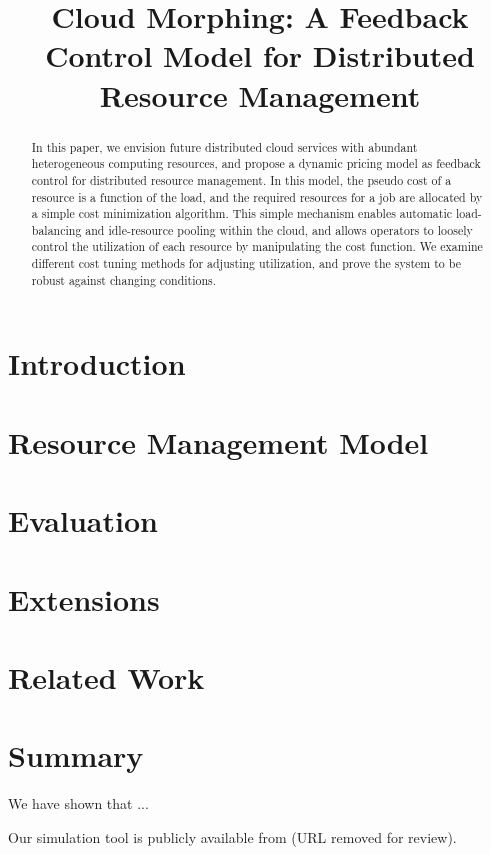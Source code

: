 \documentclass[10pt,sigconf,letterpaper,anonymous,nonacm]{acmart}
\title{Cloud Morphing: A Feedback Control Model for Distributed Resource Management}
\begin{document}
\begin{abstract}

In this paper, we envision future distributed cloud services with
abundant heterogeneous computing resources,
and propose a dynamic pricing model as feedback control for
distributed resource management.
In this model, the pseudo cost of a resource is a function of the
load, and the required resources for a job are allocated by a simple
cost minimization algorithm.
This simple mechanism enables automatic load-balancing and
idle-resource pooling within the cloud, and allows operators to
loosely control the utilization of each resource by manipulating the
cost function. We examine different cost tuning methods for adjusting
utilization, and prove the system to be robust against changing
conditions. 

\end{abstract}

\maketitle

\section{Introduction}



\section{Resource Management Model}



\section{Evaluation}



\section{Extensions}



\section{Related Work}



\section{Summary}

We have shown that ...

Our simulation tool is publicly available from (URL removed for review).



\end{document}
